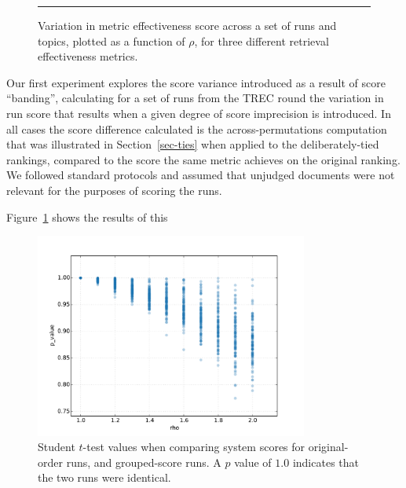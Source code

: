 \begin{figure}[t]
\centering
\rule{0.5mm}{45mm}
\caption{Variation in metric effectiveness score across a set of
{} runs and {} topics, plotted as a function of
$\rho$, for three different retrieval effectiveness metrics.
{}
{}
{}
\label{fig-scorevariation}}
\end{figure}

Our first experiment explores the score variance introduced as a
result of score ``banding'', calculating for a set of runs
from the {} TREC round the variation in run score
that results when a given degree of score imprecision is introduced.
In all cases the score difference calculated is the
across-permutations computation that was illustrated in
Section~\ref{sec-ties} when applied to the deliberately-tied
rankings, compared to the score the same metric achieves on the
original ranking.
We followed standard protocols and assumed that unjudged documents
were not relevant for the purposes of scoring the runs.

Figure~\ref{fig-scorevariation} shows the results of this
{} 

\begin{figure}[t]
\centering
\includegraphics[width=0.8\textwidth]{figs/rho-p-value.pdf}
\caption{Student $t$-test values when comparing system scores for
original-order runs, and grouped-score runs.
A $p$ value of $1.0$ indicates that the two runs were identical.
{}
{}
\label{fig-rho-p-value}}
\end{figure}

